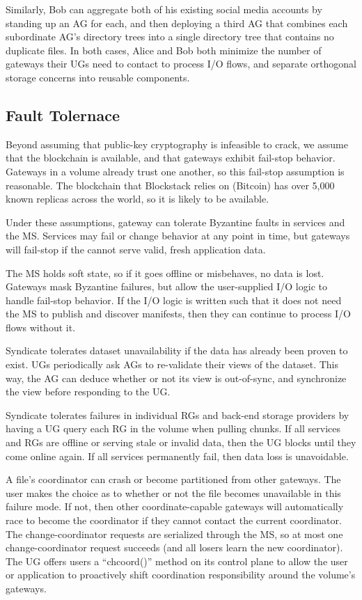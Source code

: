 Similarly, Bob can aggregate both of his existing social media accounts by
standing up an AG for each, and then deploying a third AG that combines each
subordinate AG's directory trees into a single directory tree that contains
no duplicate files. In both cases, Alice and Bob both minimize the number of
gateways their UGs need to contact to process I/O flows, and separate orthogonal
storage concerns into reusable components.

\subsection{Fault Tolernace}

Beyond assuming that public-key cryptography is infeasible to crack, we assume
that the blockchain is available, and that gateways exhibit fail-stop behavior.
Gateways in a volume already trust one another, so this fail-stop assumption is
reasonable. The blockchain that Blockstack relies on (Bitcoin) has over 5,000
known replicas across the world, so it is likely to be available.

Under these assumptions, gateway can tolerate Byzantine faults in services and
the MS. Services may fail or change behavior at any point in time, but gateways
will fail-stop if the cannot serve valid, fresh application data.

The MS holds soft state, so if it goes offline or misbehaves, no data is lost.
Gateways mask Byzantine failures, but allow the user-supplied I/O logic to
handle fail-stop behavior. If the I/O logic is written such that it does not
need the MS to publish and discover manifests, then they can
continue to process I/O flows without it.

Syndicate tolerates dataset unavailability if the data has already been proven
to exist. UGs periodically ask AGs to re-validate their views of the dataset.
This way, the AG can deduce whether or not its view is out-of-sync, and
synchronize the view before responding to the UG.

Syndicate tolerates failures in individual RGs and back-end storage providers by
having a UG query each RG in the volume when pulling chunks.  If all services
and RGs are offline or serving stale or invalid data, then the UG blocks until
they come online again. If all services permanently fail, then data loss is
unavoidable.

A file's coordinator can crash or become partitioned from other gateways.
The user makes the choice as to whether or not the file becomes unavailable
in this failure mode. If not, then other coordinate-capable gateways will
automatically race to become the coordinator if they cannot contact
the current coordinator.  The change-coordinator requests are serialized
through the MS, so at most one change-coordinator request succeeds (and all
losers learn the new coordinator). The UG offers users a
``chcoord()'' method on its control plane to allow the user or application
to proactively shift coordination responsibility around the volume's
gateways.

